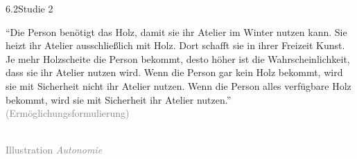 \documentclass[xcolor=table,9pt,aspectratio=169]{beamer}
\begin{document}
\begin{frame}{\vspace*{10mm}6.2\hspace*{1em}Studie 2}
\begin{multicols}{2}
   \enquote{Die Person benötigt das Holz, damit sie ihr Atelier im Winter nutzen kann. Sie heizt ihr Atelier ausschließlich mit Holz. Dort schafft sie in ihrer Freizeit Kunst. Je mehr Holzscheite die Person bekommt, desto höher ist die Wahrscheinlichkeit, dass sie ihr Atelier nutzen wird. Wenn die Person gar kein Holz bekommt, wird sie mit Sicherheit nicht ihr Atelier nutzen. Wenn die Person alles verfügbare Holz bekommt, wird sie mit Sicherheit ihr Atelier nutzen.}\\
   \medskip
   \textcolor{gray}{(Ermöglichungsformulierung)}
   \vfill
   \begin{center}
      \\
      \textcolor{gray}{Illustration \textit{Autonomie}}
   \end{center}
\end{multicols}
\end{frame}
\end{document}

